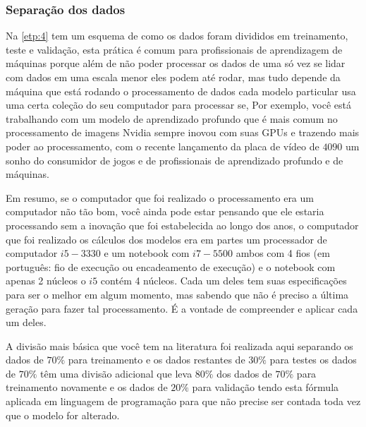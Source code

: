 \subsubsection{Separa\c c\~ao dos dados}\label{subsubsec:divisao}

Na \ref{etp:4} tem um esquema de como os dados foram divididos em treinamento, teste e validação, esta prática é comum para profissionais de aprendizagem de máquinas porque além de não poder processar os dados de uma só vez se lidar com dados em uma escala menor eles podem até rodar, mas tudo depende da máquina que está rodando o processamento de dados cada modelo particular usa uma certa coleção do seu computador para processar se, Por exemplo, você está trabalhando com um modelo de aprendizado profundo que é mais comum no processamento de imagens Nvidia sempre inovou com suas GPUs e trazendo mais poder ao processamento, com o recente lançamento da placa de vídeo de $4090$ um sonho do consumidor de jogos e de profissionais de aprendizado profundo e de máquinas.

Em resumo, se o computador que foi realizado o processamento era um computador não tão bom, você ainda pode estar pensando que ele estaria processando sem a inovação que foi estabelecida ao longo dos anos, o computador que foi realizado os cálculos dos modelos era em partes um processador de computador $i5-3330 $ e um notebook com $i7-5500 $ ambos com 4 fios (em português: fio de execução ou encadeamento de execução) e o notebook com apenas 2 núcleos o $i5 $ contém 4 núcleos. Cada um deles tem suas especificações para ser o melhor em algum momento, mas sabendo que não é preciso a última geração para fazer tal processamento. É a vontade de compreender e aplicar cada um deles.

A divisão mais básica que você tem na literatura foi realizada aqui separando os dados de $70\%$ para treinamento e os dados restantes de $30\%$ para testes os dados de $70\%$ têm uma divisão adicional que leva $80\%$ dos dados de $70\%$ para treinamento novamente e os dados de $20\%$ para validação tendo esta fórmula aplicada em linguagem de programação para que não precise ser contada toda vez que o modelo for alterado.
